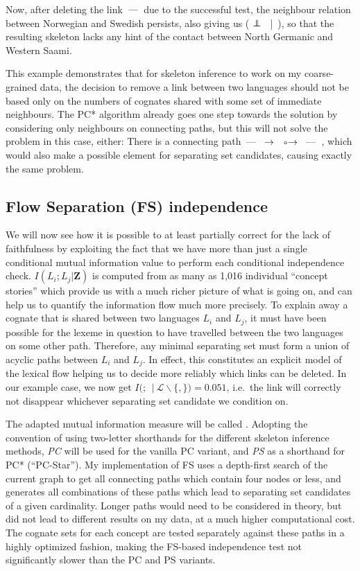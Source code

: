 Now, after deleting the link  $\arrowLL$  due to the successful test, the neighbour relation between Norwegian and Swedish persists, also giving us ( $\indep$ \ |\ ), so that the resulting skeleton lacks any hint of the contact between North Germanic and Western Saami.

This example demonstrates that for skeleton inference to work on my coarse-grained data, the decision to remove a link between two languages should not be based only on the numbers of cognates shared with some set of immediate neighbours. The PC* algorithm already goes one step towards the solution by considering only neighbours on connecting paths, but this will not solve the problem in this case, either: There is a connecting path  $\arrowLL$  $\arrowLA$  $\arrowOA$  $\arrowLL$ , which would also make  a possible element for separating set candidates, causing exactly the same problem.

\largerpage
\subsection{Flow Separation (FS) independence}
We will now see how it is possible to at least partially correct for the lack of faithfulness by exploiting the fact that we have more than just a single conditional mutual information value to perform each conditional independence check. $I(L_i;L_j|\mathbf{Z})$ is computed from as many as 1,016 individual ``concept stories'' which provide us with a much richer picture of what is going on, and can help us to quantify the information flow much more precisely. To explain away a cognate that is shared between two languages $L_i$ and $L_j$, it must have been possible for the lexeme in question to have travelled between the two languages on some other path. Therefore, any minimal separating set must form a union of acyclic paths between $L_i$ and $L_j$. In effect, this constitutes an explicit model of the lexical flow helping us to decide more reliably which links can be deleted. In our example case, we now get $I($$;\ $$\ |\ \mathcal{L}\backslash\{$$,$$\}) = 0.051$, i.e.\ the link will correctly not disappear whichever 
separating set candidate we condition on.

The adapted mutual information measure will be called \textit{}. Adopting the convention of using two-letter shorthands for the different skeleton inference methods, \textit{PC} will be used for the vanilla PC variant, and \textit{PS} as a shorthand for PC* (``PC-Star''). My implementation of FS uses a depth-first search of the current graph to get all connecting paths which contain four nodes or less, and generates all combinations of these paths which lead to separating set candidates of a given cardinality. Longer paths would need to be considered in theory, but did not lead to different results on my data, at a much higher computational cost. The cognate sets for each concept are tested separately against these paths in a highly optimized fashion, making the FS-based independence test not significantly slower than the PC and PS variants.

